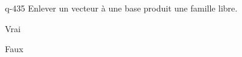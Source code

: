 \begin{truefalse}{q-435}
Enlever un vecteur à une base produit une famille libre.
\item* Vrai
\item Faux
\end{truefalse}

